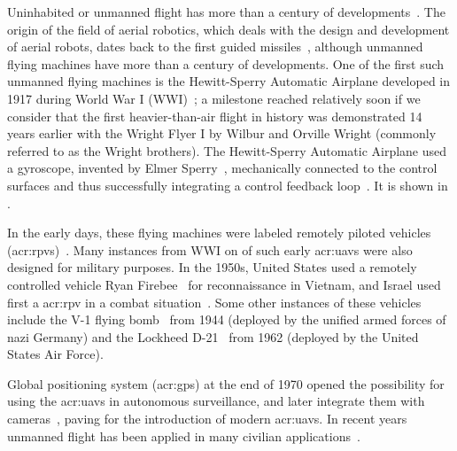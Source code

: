 Uninhabited or unmanned flight has more than a century of developments~\citep{siciliano2016springer}. The origin of the field of aerial robotics, which deals with the design and development of aerial robots, dates back to the first guided missiles~\citep{siciliano2016springer}, although unmanned flying machines have more than a century of developments. One of the first such unmanned flying machines is the Hewitt-Sperry Automatic Airplane developed in 1917 during World War I (WWI)~\citep{keane2013brief,valavanis2015handbook}; a milestone reached relatively soon if we consider that the first heavier-than-air flight in history was demonstrated 14 years earlier with the Wright Flyer I by Wilbur and Orville Wright (commonly referred to as the Wright brothers). The Hewitt-Sperry Automatic Airplane used a gyroscope, invented by Elmer Sperry~\citep{keane2013brief}, mechanically connected to the control surfaces and thus successfully integrating a control feedback loop~\citep{siciliano2016springer}. It is shown in .

In the early days, these flying machines were labeled remotely piloted vehicles (\Gls{acr:rpv}s)~\citep{anderson2005introduction}. Many instances from WWI on of such early \Gls{acr:uav}s were also designed for military purposes. In the 1950s, United States used a remotely controlled vehicle Ryan Firebee~ for reconnaissance in Vietnam, and Israel used first a \Gls{acr:rpv} in a combat situation~\citep{anderson2005introduction}. Some other instances of these vehicles include the V-1 flying bomb~ from 1944 (deployed by the unified armed forces of nazi Germany) and the Lockheed D-21~ from 1962 (deployed by the United States Air Force).

Global positioning system (\Gls{acr:gps}) at the end of 1970 opened the possibility for using the \Gls{acr:uav}s in autonomous surveillance, and later integrate them with cameras~\citep{siciliano2016springer}, paving for the introduction of modern \Gls{acr:uav}s. In recent years unmanned flight has been applied in many civilian applications~\citep{gonzalez2017unmanned}. 

